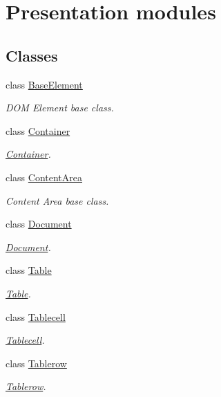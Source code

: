\section{Presentation modules}
\label{group__OWL__UI__LAYER}
\subsection*{Classes}
\begin{DoxyCompactItemize}
\item 
class \hyperlink{classBaseElement}{BaseElement}
\begin{DoxyCompactList}\small\item\em DOM Element base class. \item\end{DoxyCompactList}\item 
class \hyperlink{classContainer}{Container}
\begin{DoxyCompactList}\small\item\em \hyperlink{classContainer}{Container}. \item\end{DoxyCompactList}\item 
class \hyperlink{classContentArea}{ContentArea}
\begin{DoxyCompactList}\small\item\em Content Area base class. \item\end{DoxyCompactList}\item 
class \hyperlink{classDocument}{Document}
\begin{DoxyCompactList}\small\item\em \hyperlink{classDocument}{Document}. \item\end{DoxyCompactList}\item 
class \hyperlink{classTable}{Table}
\begin{DoxyCompactList}\small\item\em \hyperlink{classTable}{Table}. \item\end{DoxyCompactList}\item 
class \hyperlink{classTablecell}{Tablecell}
\begin{DoxyCompactList}\small\item\em \hyperlink{classTablecell}{Tablecell}. \item\end{DoxyCompactList}\item 
class \hyperlink{classTablerow}{Tablerow}
\begin{DoxyCompactList}\small\item\em \hyperlink{classTablerow}{Tablerow}. \item\end{DoxyCompactList}\end{DoxyCompactItemize}
